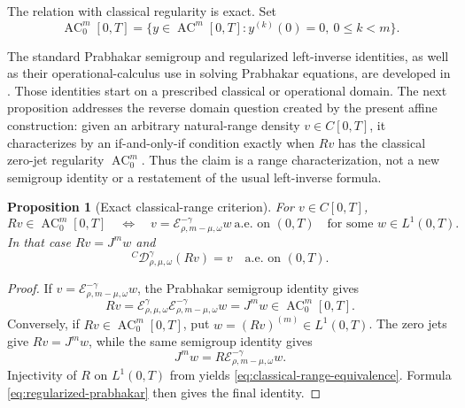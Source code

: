 \documentclass[11pt]{article}
\numberwithin{equation}{section}
\newtheorem{proposition}{Proposition}
\theoremstyle{definition}
\theoremstyle{remark}
\newcommand{\D}{\mathcal D}
\newcommand{\E}{\mathcal E}
\newcommand{\AC}{\operatorname{AC}}
\begin{document}
The relation with classical regularity is exact. Set
\begin{equation*}
\AC_0^m[0,T]
=\{y\in\AC^m[0,T]:y^{(k)}(0)=0,\ 0\le k<m\}.
\end{equation*}

The standard Prabhakar semigroup and regularized left-inverse identities, as well as their operational-calculus use in solving Prabhakar equations, are developed in \cite{Giusti2020,RaniFernandez2022a,RaniFernandez2022b}. Those identities start on a prescribed classical or operational domain. The next proposition addresses the reverse domain question created by the present affine construction: given an arbitrary natural-range density $v\in C[0,T]$, it characterizes by an if-and-only-if condition exactly when $Rv$ has the classical zero-jet regularity $\AC_0^m$. Thus the claim is a range characterization, not a new semigroup identity or a restatement of the usual left-inverse formula.

\begin{proposition}[Exact classical-range criterion]\label{prop:classical-range}
For $v\in C[0,T]$,
\begin{equation}
Rv\in\AC_0^m[0,T]
\quad\Longleftrightarrow\quad
v=\E_{\rho,m-\mu,\omega}^{-\gamma}w
\ \text{a.e. on }(0,T)
\quad\text{for some }w\in L^1(0,T).
\label{eq:classical-range-equivalence}
\end{equation}
In that case $Rv=J^mw$ and
\begin{equation*}
{}^C\!\D_{\rho,\mu,\omega}^{\gamma}(Rv)=v
\quad\text{a.e. on }(0,T).
\end{equation*}
\end{proposition}

\begin{proof}
If $v=\E_{\rho,m-\mu,\omega}^{-\gamma}w$, the Prabhakar semigroup identity gives
\begin{equation*}
Rv
=\E_{\rho,\mu,\omega}^{\gamma}
 \E_{\rho,m-\mu,\omega}^{-\gamma}w
=J^mw\in\AC_0^m[0,T].
\end{equation*}
Conversely, if $Rv\in\AC_0^m[0,T]$, put $w=(Rv)^{(m)}\in L^1(0,T)$. The zero jets give $Rv=J^mw$, while the same semigroup identity gives
\begin{equation*}
J^mw=R\E_{\rho,m-\mu,\omega}^{-\gamma}w.
\end{equation*}
Injectivity of $R$ on $L^1(0,T)$ from  yields \eqref{eq:classical-range-equivalence}. Formula \eqref{eq:regularized-prabhakar} then gives the final identity.
\end{proof}
\end{document}
